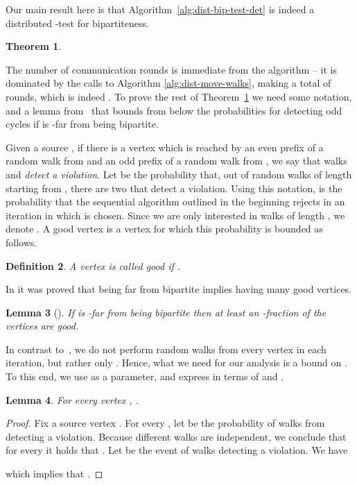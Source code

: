 \documentclass[11pt]{article}
\newtheorem{theorem}{Theorem}[section]
\newtheorem{lemma}[theorem]{Lemma}
\newtheorem{definition}[theorem]{Definition}
\begin{document}
Our main result here is that Algorithm~\ref{alg:dist-bip-test-det} is indeed a distributed -test for bipartiteness.

\begin{theorem}
\label{thm:bi}
\ThmBi
\end{theorem}

The number of communication rounds is immediate from the algorithm -- it is dominated by the  calls to Algorithm \ref{alg:dist-move-walks}, making a total of  rounds, which is indeed . To prove the rest of Theorem~\ref{thm:bi} we need some notation, and a lemma from~\cite{GR99} that bounds from below the probabilities for detecting odd cycles if  is -far from being bipartite.

Given a source , if there is a vertex  which is reached by an even prefix of a random walk  from  and an odd prefix of a random walk  from , we say that walks  and  \emph{detect a violation}. Let  be the probability that, out of  random walks of length  starting from , there are two that detect a violation.
Using this notation,  is the probability that the sequential algorithm outlined in the beginning rejects in an iteration in which  is chosen. Since we are only interested in walks of length , we denote . A good vertex is a vertex for which this probability is bounded as follows.
\begin{definition}
\label{def:good}
A vertex  is called \emph{good} if .
\end{definition}

In \cite{GR99} it was proved that being far from bipartite implies having many good vertices.

\begin{lemma}[\cite{GR99}]
\label{lemma:GR}
If  is -far from being bipartite then at least an -fraction of the vertices are good.
\end{lemma}

In contrast to~\cite{GR99}, we do not perform  random walks from every vertex in each iteration, but rather only . Hence, what we need for our analysis is a bound on . To this end, we use  as a parameter, and express  in terms of  and .

\begin{lemma}
\label{lemma:ps2}
For every vertex , .
\end{lemma}
\begin{proof}
Fix a source vertex . For every , let  be the probability of walks  from  detecting a violation. Because different walks are independent, we conclude that for every  it holds that . Let  be the event of walks  detecting a violation. We have

which implies that .
\end{proof}
\end{document}
